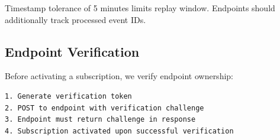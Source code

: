 \begin{theorem}
Timestamp tolerance of 5 minutes limits replay window. Endpoints should additionally track processed event IDs.
\end{theorem}

\subsection{Endpoint Verification}

Before activating a subscription, we verify endpoint ownership:

\begin{lstlisting}[caption=Endpoint Verification Flow]
1. Generate verification token
2. POST to endpoint with verification challenge
3. Endpoint must return challenge in response
4. Subscription activated upon successful verification
\end{lstlisting}

